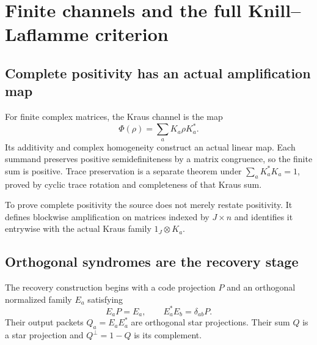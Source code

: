 \section{Finite channels and the full Knill--Laflamme criterion}
\label{sec:recovery}

\subsection{Complete positivity has an actual amplification map}
For finite complex matrices, the Kraus channel is the map
\[
\Phi(\rho)=\sum_aK_a\rho K_a^*.
\]
Its additivity and complex homogeneity construct an actual linear map. Each summand preserves positive semidefiniteness by a matrix congruence, so the finite sum is positive. Trace preservation is a separate theorem under $\sum_aK_a^*K_a=1$, proved by cyclic trace rotation and completeness of that Kraus sum.

To prove complete positivity the source does not merely restate positivity. It defines blockwise amplification on matrices indexed by $J\times n$ and identifies it entrywise with the actual Kraus family $1_J\otimes K_a$.




\subsection{Orthogonal syndromes are the recovery stage}
The recovery construction begins with a code projection $P$ and an orthogonal normalized family $E_a$ satisfying
\[
E_aP=E_a,\qquad E_a^*E_b=\delta_{ab}P.
\]
Their output packets $Q_a=E_aE_a^*$ are orthogonal star projections. Their sum $Q$ is a star projection and $Q^\perp=1-Q$ is its complement.

